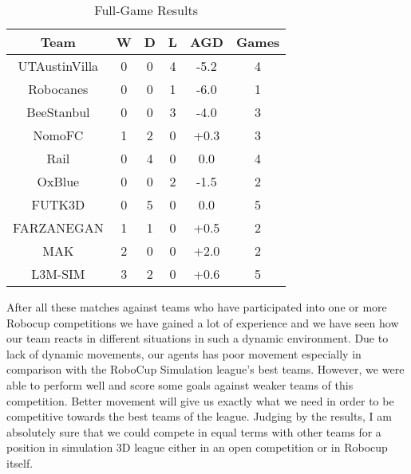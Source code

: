 \begin{table}
\begin{center}
    \begin{tabular}{ | c | c | c | c | c | c | }
    \hline
    \textbf{Team} 	& \textbf{W} & \textbf{D} & \textbf{L} & \textbf{AGD}\footnotemark 	& \textbf{Games}   \\ \hline
    UTAustinVilla 	& 0		& 0		& 4		& -5.2		& 4 			\\ \hline	
    Robocanes 		& 0		& 0		& 1		& -6.0		& 1 			\\ \hline
    BeeStanbul		& 0		& 0		& 3		& -4.0		& 3				\\ \hline
    NomoFC 			& 1		& 2		& 0		& +0.3 		& 3 			\\ \hline
    Rail 			& 0		& 4		& 0		& 0.0 		& 4 			\\ \hline
    OxBlue 			& 0		& 0		& 2		& -1.5 		& 2 			\\ \hline
    FUTK3D 			& 0		& 5		& 0		& 0.0 		& 5 			\\ \hline
    FARZANEGAN 		& 1		& 1		& 0		& +0.5 		& 2 			\\ \hline
    MAK 			    & 2		& 0		& 0		& +2.0 		& 2 			\\ \hline
    L3M-SIM			& 3		& 2   	& 0		& +0.6 		& 5 			\\     
    \hline
    \end{tabular}
\end{center}
\label{GameResults}
\caption{Full-Game Results}
\end{table}




After all these matches against teams who have participated into one or more Robocup competitions we have gained a lot of experience and we have seen how our team reacts in different situations in such a dynamic environment. Due to lack of dynamic movements, our agents has poor movement especially in comparison with the RoboCup Simulation league's best teams. However, we were able to perform well and score some goals against weaker teams of this competition. Better movement will give us exactly what we need in order to be competitive towards the best teams of the league. Judging by the results, I am absolutely sure that we could compete in equal terms with other teams for a position in simulation 3D league either in an open competition or in Robocup itself.

